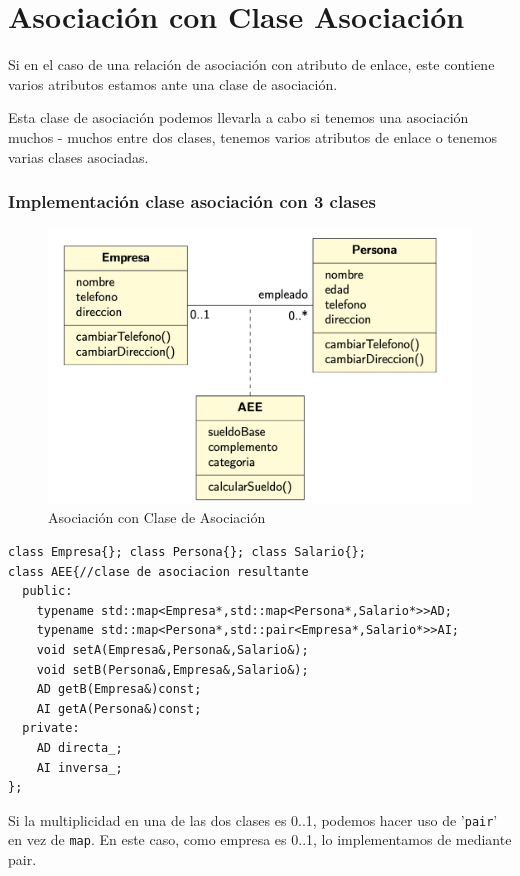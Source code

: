 \chapter{ Asociación con Clase Asociación}
Si en el caso de una relación de asociación con atributo de enlace, este contiene varios atributos 
estamos ante una clase de asociación.

Esta clase de asociación podemos llevarla a cabo si tenemos una asociación muchos - muchos 
entre dos clases, tenemos varios atributos de enlace o tenemos varias clases asociadas.
\subsection{Implementación clase asociación con 3 clases}
\begin{figure}[h]
    \centering
    \includegraphics[width=\textwidth]{Imagenes/AClS.png}
    \caption{Asociación con Clase de Asociación}
\end{figure}
\begin{center}
	\begin{lstlisting}[frame=single]
class Empresa{}; class Persona{}; class Salario{};
class AEE{//clase de asociacion resultante
  public:
    typename std::map<Empresa*,std::map<Persona*,Salario*>>AD;
    typename std::map<Persona*,std::pair<Empresa*,Salario*>>AI;
    void setA(Empresa&,Persona&,Salario&);
    void setB(Persona&,Empresa&,Salario&);
    AD getB(Empresa&)const;
    AI getA(Persona&)const;
  private:
    AD directa_;
    AI inversa_;
};
\end{lstlisting}
\end{center}
Si la multiplicidad en una de las dos clases es 0..1, podemos hacer uso de '\texttt{pair}' 
en vez de \texttt{map}.
En este caso, como empresa es 0..1, lo implementamos de mediante pair.
